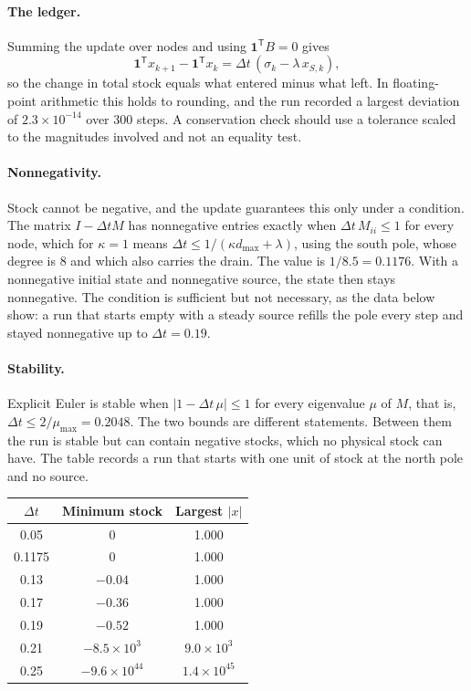 \paragraph{The ledger.} Summing the update over nodes and using $\mathbf 1^{\mathsf T}B=0$ gives
\[
  \mathbf 1^{\mathsf T}x_{k+1}-\mathbf 1^{\mathsf T}x_k=\Delta t\,(\sigma_k-\lambda\,x_{S,k}),
\]
so the change in total stock equals what entered minus what left. In floating-point arithmetic this holds to rounding, and the run recorded a largest deviation of $2.3\times10^{-14}$ over $300$ steps. A conservation check should use a tolerance scaled to the magnitudes involved and not an equality test.

\paragraph{Nonnegativity.} Stock cannot be negative, and the update guarantees this only under a condition. The matrix $I-\Delta tM$ has nonnegative entries exactly when $\Delta t\,M_{ii}\le1$ for every node, which for $\kappa=1$ means $\Delta t\le1/(\kappa d_{\max}+\lambda)$, using the south pole, whose degree is $8$ and which also carries the drain. The value is $1/8.5=0.1176$. With a nonnegative initial state and nonnegative source, the state then stays nonnegative. The condition is sufficient but not necessary, as the data below show: a run that starts empty with a steady source refills the pole every step and stayed nonnegative up to $\Delta t=0.19$.

\paragraph{Stability.} Explicit Euler is stable when $|1-\Delta t\,\mu|\le1$ for every eigenvalue $\mu$ of $M$, that is, $\Delta t\le2/\mu_{\max}=0.2048$. The two bounds are different statements. Between them the run is stable but can contain negative stocks, which no physical stock can have. The table records a run that starts with one unit of stock at the north pole and no source.

\begin{center}
\begin{tabular}{@{}ccc@{}}
\toprule
$\Delta t$ & Minimum stock & Largest $|x|$\\
\midrule
0.05 & 0 & 1.000\\
0.1175 & 0 & 1.000\\
0.13 & $-0.04$ & 1.000\\
0.17 & $-0.36$ & 1.000\\
0.19 & $-0.52$ & 1.000\\
0.21 & $-8.5\times10^{3}$ & $9.0\times10^{3}$\\
0.25 & $-9.6\times10^{44}$ & $1.4\times10^{45}$\\
\bottomrule
\end{tabular}
\end{center}

